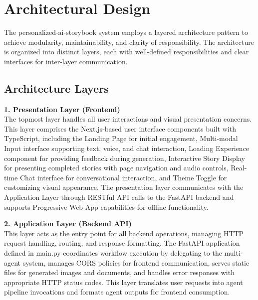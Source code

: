 \section{Architectural Design}
The personalized-ai-storybook system employs a layered architecture pattern to achieve modularity, maintainability, and clarity of responsibility. The architecture is organized into distinct layers, each with well-defined responsibilities and clear interfaces for inter-layer communication.

\subsection{Architecture Layers}

\textbf{1. Presentation Layer (Frontend)}\\
The topmost layer handles all user interactions and visual presentation concerns. This layer comprises the Next.js-based user interface components built with TypeScript, including the Landing Page for initial engagement, Multi-modal Input interface supporting text, voice, and chat interaction, Loading Experience component for providing feedback during generation, Interactive Story Display for presenting completed stories with page navigation and audio controls, Real-time Chat interface for conversational interaction, and Theme Toggle for customizing visual appearance. The presentation layer communicates with the Application Layer through RESTful API calls to the FastAPI backend and supports Progressive Web App capabilities for offline functionality.

\textbf{2. Application Layer (Backend API)}\\
This layer acts as the entry point for all backend operations, managing HTTP request handling, routing, and response formatting. The FastAPI application defined in main.py coordinates workflow execution by delegating to the multi-agent system, manages CORS policies for frontend communication, serves static files for generated images and documents, and handles error responses with appropriate HTTP status codes. This layer translates user requests into agent pipeline invocations and formats agent outputs for frontend consumption.


